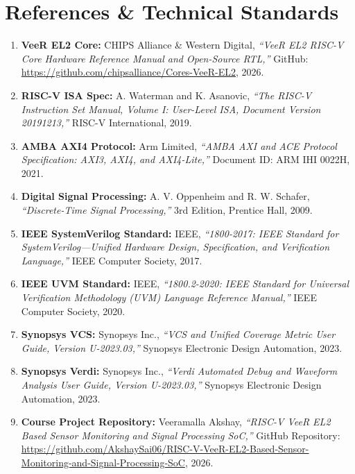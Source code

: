 \documentclass[12pt,a4paper,oneside]{report}
\begin{document}
\chapter*{References \& Technical Standards}
\begin{enumerate}
    \item \textbf{VeeR EL2 Core:} CHIPS Alliance \& Western Digital, \textit{``VeeR EL2 RISC-V Core Hardware Reference Manual and Open-Source RTL,''} GitHub: \url{https://github.com/chipsalliance/Cores-VeeR-EL2}, 2026.
    \item \textbf{RISC-V ISA Spec:} A. Waterman and K. Asanovic, \textit{``The RISC-V Instruction Set Manual, Volume I: User-Level ISA, Document Version 20191213,''} RISC-V International, 2019.
    \item \textbf{AMBA AXI4 Protocol:} Arm Limited, \textit{``AMBA AXI and ACE Protocol Specification: AXI3, AXI4, and AXI4-Lite,''} Document ID: ARM IHI 0022H, 2021.
    \item \textbf{Digital Signal Processing:} A. V. Oppenheim and R. W. Schafer, \textit{``Discrete-Time Signal Processing,''} 3rd Edition, Prentice Hall, 2009.
    \item \textbf{IEEE SystemVerilog Standard:} IEEE, \textit{``1800-2017: IEEE Standard for SystemVerilog---Unified Hardware Design, Specification, and Verification Language,''} IEEE Computer Society, 2017.
    \item \textbf{IEEE UVM Standard:} IEEE, \textit{``1800.2-2020: IEEE Standard for Universal Verification Methodology (UVM) Language Reference Manual,''} IEEE Computer Society, 2020.
    \item \textbf{Synopsys VCS:} Synopsys Inc., \textit{``VCS and Unified Coverage Metric User Guide, Version U-2023.03,''} Synopsys Electronic Design Automation, 2023.
    \item \textbf{Synopsys Verdi:} Synopsys Inc., \textit{``Verdi Automated Debug and Waveform Analysis User Guide, Version U-2023.03,''} Synopsys Electronic Design Automation, 2023.
    \item \textbf{Course Project Repository:} Veeramalla Akshay, \textit{``RISC-V VeeR EL2 Based Sensor Monitoring and Signal Processing SoC,''} GitHub Repository: \url{https://github.com/AkshaySai06/RISC-V-VeeR-EL2-Based-Sensor-Monitoring-and-Signal-Processing-SoC}, 2026.
\end{enumerate}
\end{document}
